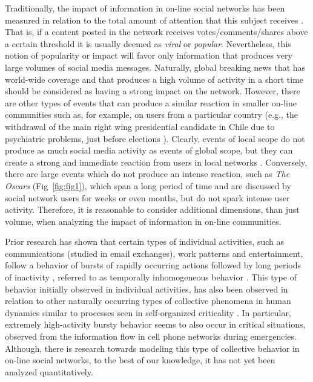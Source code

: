 \documentclass[10pt,letterpaper]{article}
\begin{document}
Traditionally, the impact of information in on-line social networks has been
measured in relation to the total amount of attention that this subject receives
\cite{berger2012makes,iribarren2011branching,guerini2011exploring,mills2012virality,gaugaz2012predicting}.
That is, if a content posted in the network receives
votes/comments/shares above a certain threshold it is usually deemed as {\em viral} or
{\em popular}. Nevertheless, this
notion of popularity or impact will favor only information that produces very large
volumes of social media messages. 
Naturally, global breaking news that has world-wide coverage and that produces a high volume of
activity in a short time should be considered as
having a strong impact on the network.  However, there are other types of events
that can produce a similar reaction in smaller on-line communities
such as, for example, on users from a particular country
(e.g., the
withdrawal of the main right wing presidential candidate in Chile due
to psychiatric problems, just before
elections \cite{chile_elections}).
Clearly, events of local scope do not produce as much social media
activity as events of global scope, but they can create a strong and
immediate reaction from users in local networks \cite{ReisBOPKA15}. Conversely,
there are large events which do not produce an intense reaction, such as
{\em The Oscars} (Fig~\ref{fig:fig1}), which span a long
period of time and are discussed by social network users for weeks or
even months, but do not spark intense user activity. Therefore, it is reasonable to consider additional dimensions,
than just volume, when analyzing the impact of information in on-line communities.  

Prior research has shown that certain types of individual activities,
such as communications (studied in email exchanges), work patterns and
entertainment, follow a behavior of bursts of rapidly occurring
actions followed by long periods of inactivity
\cite{barabasi2005origin}, referred to as {temporally inhomogeneous}
behavior \cite{karsai2012universal}.  This type of behavior initially
observed in individual activities, has also been observed in relation
to other naturally occurring types of collective phenomena in human
dynamics similar to processes seen in self-organized criticality
\cite{karsai2012universal}.  In particular, extremely high-activity
bursty behavior seems to also occur in critical situations, observed
from the information flow in cell phone networks during
emergencies\cite{gao2014quantifying}.  Although, there is research
towards modeling this type of collective behavior
\cite{yan2013information} in on-line social networks, to the best of
our knowledge, it has not yet been analyzed quantitatively.
\end{document}
